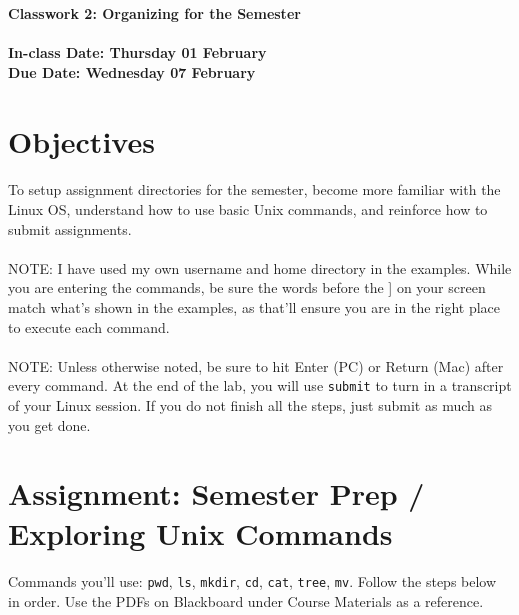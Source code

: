 \documentclass[letter,11pt]{article}
\begin{document}
\huge
\textbf{Classwork 2: Organizing for the Semester}
\normalsize
\\ ~~ \\
\textbf{In-class Date: Thursday 01 February} \\
\textbf{Due Date: Wednesday 07 February}

\section*{Objectives}
\paragraph{}To setup assignment directories for the semester, become more familiar with the Linux OS, understand how to use basic Unix commands, and reinforce how to submit assignments.
\paragraph{}NOTE: I have used my own username and home directory in the examples. While you are entering the commands, be sure the words before the ] on your screen match what’s shown in the examples, as that’ll ensure you are in the right place to execute each command.
\paragraph{}NOTE: Unless otherwise noted, be sure to hit Enter (PC) or Return (Mac) after every command. At the end of the lab, you will use \texttt{submit} to turn in a transcript of your Linux session. If you do not finish all the steps, just submit as much as you get done.

\section*{Assignment: Semester Prep / Exploring Unix Commands}
\paragraph{}Commands you'll use: \texttt{pwd}, \texttt{ls}, \texttt{mkdir}, \texttt{cd}, \texttt{cat}, \texttt{tree}, \texttt{mv}. Follow the steps below in order. Use the PDFs on Blackboard under Course Materials as a reference.
\end{document}

